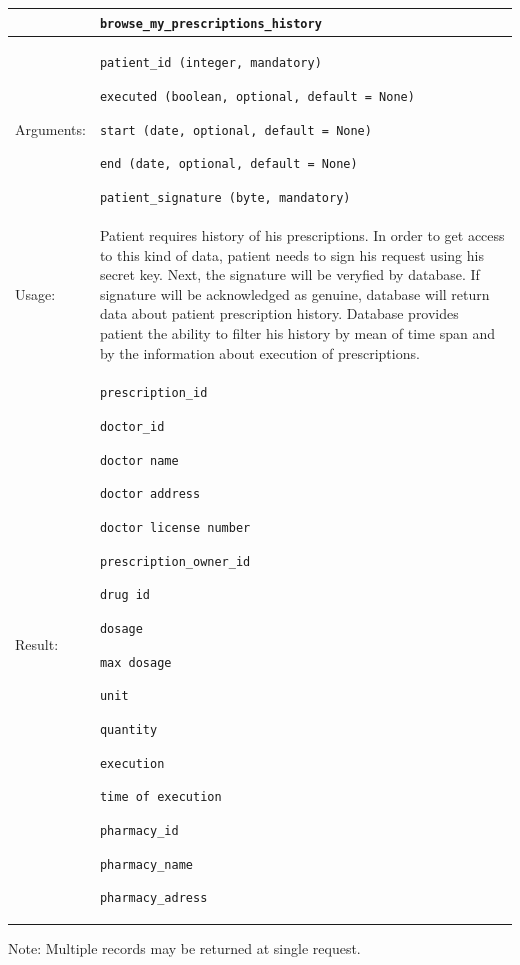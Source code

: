 
    \begin{longtable}{| p{3cm} | p{10.75cm} |}
    \hline
     & \texttt{browse\_my\_prescriptions\_history} \\ \hline
    Arguments: &  \begin{packed_enum}
    	\item \texttt{patient\_id (integer, mandatory)}
		\item \texttt{executed (boolean, optional, default = None)}
		\item \texttt{start (date, optional, default = None)}
		\item \texttt{end (date, optional, default = None)}
		\item \texttt{patient\_signature (byte, mandatory)}
	\end{packed_enum}     \\ \hline
    Usage: & Patient requires history of his prescriptions. In order to get access to this kind of data, patient needs to sign his request using his secret key. Next, the signature will be veryfied by database. If signature will be acknowledged as genuine, database will return data about patient prescription history. Database provides patient the ability to filter his history by mean of time span and by the information about execution of prescriptions. \\ \hline
    Result: & \begin{packed_enum}
    	\item \texttt{prescription\_id}
    	\item \texttt{doctor\_id}
    	\item \texttt{doctor name}
    	\item \texttt{doctor address}
    	\item \texttt{doctor license number}
    	\item \texttt{prescription\_owner\_id}
    	\item \texttt{drug id}
    	\item \texttt{dosage}
    	\item \texttt{max dosage}
    	\item \texttt{unit}
    	\item \texttt{quantity}
    	\item \texttt{execution}
    	\item \texttt{time of execution}
    	\item \texttt{pharmacy\_id}
    	\item \texttt{pharmacy\_name}
    	\item \texttt{pharmacy\_adress}
	\end{packed_enum}     \\ \hline	
    \end{longtable}
Note: Multiple records may be returned at single request.

